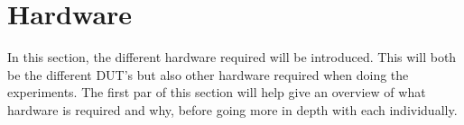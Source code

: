 \section{Hardware}\label{sec:hardware}


In this section, the different hardware required will be introduced. This will both be the different DUT's but also other hardware required when doing the experiments. The first par of this section will help give an overview of what hardware is required and why, before going more in depth with each individually.




